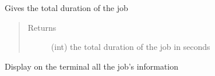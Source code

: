 \documentclass[a4paper,10pt,english]{sphinxmanual}
\begin{document}
\begin{fulllineitems}

\begin{fulllineitems}
\label{\detokenize{apidoc_commands/commands:commands.jobs.Job.total_duration}}
Gives the total duration of the job
\begin{quote}\begin{description}
\item[{Returns}] \leavevmode
(int) the total duration of the job in seconds

\end{description}\end{quote}

\end{fulllineitems}


\begin{fulllineitems}
\label{\detokenize{apidoc_commands/commands:commands.jobs.Job.write_results}}
Display on the terminal all the job’s information

\end{fulllineitems}


\end{fulllineitems}

\end{document}
